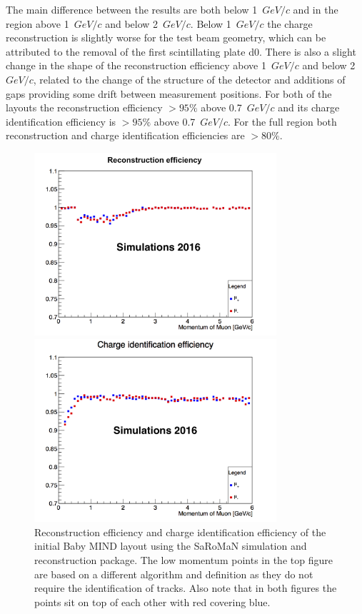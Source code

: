 The main difference between the results are both below 1~$GeV/c$ and in the region above 1~$GeV/c$ and below 2~$GeV/c$. Below 1~$GeV/c$ the charge reconstruction is slightly worse for the test beam geometry, which can be attributed to the removal of the first scintillating plate d0. There is also a slight change in the shape of the reconstruction efficiency above 1~$GeV/c$ and below 2~$GeV/c$, related to the change of the structure of the detector and additions of gaps providing some drift between measurement positions. For both of the layouts the reconstruction efficiency $> 95\%$ above 0.7~$GeV/c$ and its charge identification efficiency is $> 95\%$ above 0.7~$GeV/c$. For the full region both reconstruction and charge identification efficiencies are $> 80\% $. 

\begin{figure}[h!]
\centering
\includegraphics[width=0.8\textwidth]{figures/oldStudies/oldRecEff.png}

\includegraphics[width=0.8\textwidth]{figures/oldStudies/oldChargeID.png}
\caption{Reconstruction efficiency and charge identification efficiency of the initial Baby MIND layout using the SaRoMaN simulation and reconstruction package. The low momentum points in the top figure are based on a different algorithm and definition as they do not require the identification of tracks. Also note that in both figures the points sit on top of each other with red covering blue.}
\label{fig:oldMIND2}
\end{figure}

